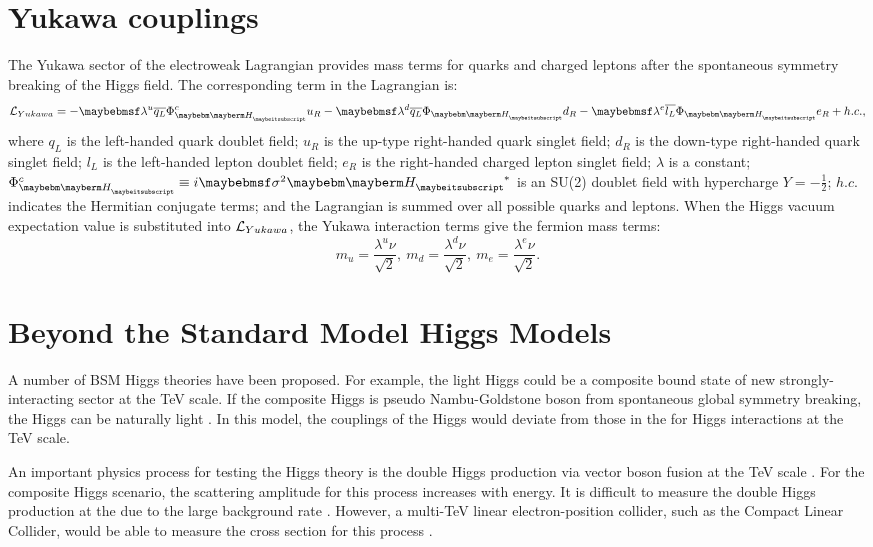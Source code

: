 \section{Yukawa couplings}

The Yukawa sector of the electroweak Lagrangian provides mass terms for quarks and charged leptons after the spontaneous symmetry breaking of the Higgs field. The  corresponding term in the Lagrangian is:
\begin{equation}
\Lagr_{Yukawa} = -\lambda^{u}\overline{q_L}\Phi_{\PH}^{c}u_R  - \lambda^{d}\overline{q_L}\Phi_{\PH}{d}_R - \lambda^{e}\overline{l_L}\Phi_{\PH}e_R + h.c. ,
\end{equation}
where $q_L$ is the left-handed quark doublet field; $u_R$ is the up-type right-handed quark singlet field;  $d_R$ is the down-type right-handed quark singlet field; $l_L$ is the left-handed lepton doublet field; $e_R$ is the right-handed charged lepton singlet field; $\lambda$ is a constant; $\Phi_{\PH}^{c} \equiv i \sigma^2{\PH}^*$ is an SU(2) doublet field with hypercharge $Y = -\frac{1}{2}$; $h.c.$ indicates the Hermitian conjugate terms; and the Lagrangian is summed over all possible quarks and leptons. When the Higgs vacuum expectation value is substituted into $\operatorname{\mathcal{L}}_{Yukawa}$, the Yukawa interaction terms give the fermion mass terms:
\begin{equation}
m_{u} = \frac{\lambda^u{\nu}}{\sqrt{2}},\ m_{d} = \frac{\lambda^d{\nu}}{\sqrt{2}},\ m_{e} = \frac{\lambda^e{\nu}}{\sqrt{2}}.
\end{equation}


\section{Beyond the Standard Model Higgs Models}
\label{sec:theoryHiggsBSM}

A number of BSM Higgs theories have been proposed. For example, the light Higgs could be a composite bound state of new strongly-interacting sector at the TeV scale. If the composite Higgs is  pseudo Nambu-Goldstone boson from spontaneous global symmetry breaking, the Higgs can be naturally light \cite{Kaplan:1983fs}.  In this model, the couplings of the Higgs would deviate from those in the \SM for  Higgs interactions at the TeV scale.


An important physics process for testing the Higgs theory is the double Higgs production via vector boson fusion at the TeV scale \cite{Giudice:2007fh,Contino:2010mh,Contino:2013gna}. For the composite Higgs scenario, the scattering amplitude for this process increases with energy. It is difficult  to measure the double Higgs production at the \LHC due to the large \SM background rate \cite{Contino:2010mh}. However, a multi-TeV linear electron-position collider, such as the Compact Linear Collider, would be able to measure the cross section for  this process \cite{Barger:2003rs}.

